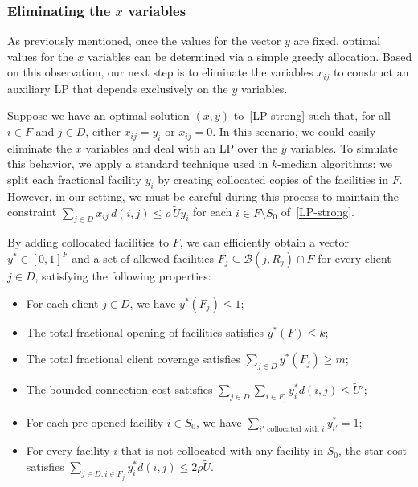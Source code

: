 \subsubsection{Eliminating the $x$ variables}

As previously mentioned, once the values for the vector $y$ are fixed, optimal values for the $x$ variables can be determined via a simple greedy allocation. Based on this observation, our next step is to eliminate the variables $x_{ij}$ to construct an auxiliary LP that depends exclusively on the $y$ variables.

Suppose we have an optimal solution $(x,y)$ to~\eqref{LP-strong} such that, for all $i \in F$ and $j \in D$, either $x_{ij} = y_i$ or $x_{ij} = 0$. In this scenario, we could easily eliminate the $x$ variables and deal with an LP over the $y$ variables. To simulate this behavior, we apply a standard technique used in $k$-median algorithms: we split each fractional facility $y_i$ by creating collocated copies of the facilities in $F$. However, in our setting, we must be careful during this process to maintain the constraint $\sum_{j \in D} x_{ij}\, d(i,j) \leq \rho\, \tilde{U} y_i$ for each $ i \in F \setminus S_0$ of~\eqref{LP-strong}.

\begin{lemma} \label{lem:eliminate_x}
By adding collocated facilities to $F$, we can efficiently obtain a vector $y^* \in [0,1]^F$ and a set of allowed facilities $F_j \subseteq \mathcal{B}(j, R_j) \cap F$ for every client $j \in D$, satisfying the following properties:
\begin{itemize}
    \item[(a)] For each client $j \in D$, we have $y^*(F_j) \leq 1$;
    \item[(b)] The total fractional opening of facilities satisfies $y^*(F) \leq k$;
    \item[(c)] The total fractional client coverage satisfies $\sum_{j \in D} y^*(F_j) \geq m$;
    \item[(d)] The bounded connection cost satisfies $\sum_{j \in D} \sum_{i \in F_j} y^*_i d(i, j) \leq \tilde{U}'$;
    \item[(e)] For each pre-opened facility $i \in S_0$, we have $\sum_{i' \text{ collocated with } i} y^*_{i'} = 1$;
    \item[(f)] For every facility $i$ that is not collocated with any facility in $S_0$, the star cost satisfies $\sum_{j \in D : i \in F_j} y^*_i d(i, j) \leq 2\rho\tilde{U}$.
\end{itemize}
\end{lemma}

